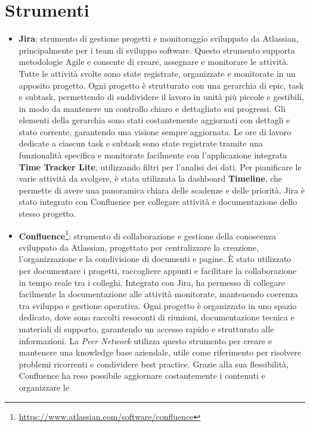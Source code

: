 \section{Strumenti}
\begin{itemize}
    \item \textbf{Jira}: strumento di gestione progetti e monitoraggio sviluppato da Atlassian, principalmente per i team di sviluppo software. Questo strumento
    supporta metodologie Agile e consente di creare, assegnare e monitorare le attività. Tutte le attività svolte sono state registrate, organizzate e monitorate
    in un apposito progetto. Ogni progetto è strutturato con una gerarchia di epic, task e subtask, permettendo di suddividere il lavoro in unità più piccole e
    gestibili, in modo da mantenere un controllo chiaro e dettagliato sui progressi. Gli elementi della gerarchia sono stati costantemente aggiornati con dettagli
    e stato corrente, garantendo una visione sempre aggiornata. Le ore di lavoro dedicate a ciascun task e subtask sono state registrate tramite una funzionalità
    specifica e monitorate facilmente con l’applicazione integrata \textbf{Time Tracker Lite}, utilizzando filtri per l’analisi dei dati. Per pianificare le varie attività
    da svolgere, è stata utilizzata la dashboard \textbf{Timeline}, che permette di avere una panoramica chiara delle scadenze e delle priorità. Jira è stato integrato con
    Confluence per collegare attività e documentazione dello stesso progetto.
    \item \textbf{Confluence}\footnote{\url{https://www.atlassian.com/software/confluence}}: strumento di collaborazione e gestione della conoscenza sviluppato da Atlassian, progettato per centralizzare la creazione, l'organizzazione
    e la condivisione di documenti e pagine. È stato utilizzato per documentare i progetti, raccogliere appunti e facilitare la collaborazione in tempo reale tra i colleghi.
    Integrato con Jira, ha permesso di collegare facilmente la documentazione alle attività monitorate, mantenendo coerenza tra sviluppo e gestione operativa. Ogni progetto
    è organizzato in uno spazio dedicato, dove sono raccolti resoconti di riunioni, documentazione tecnica e materiali di supporto, garantendo un accesso rapido e
    strutturato alle informazioni. La \textit{Peer Network} utilizza questo strumento per creare e mantenere una knowledge base aziendale, utile come riferimento per risolvere
    problemi ricorrenti e condividere best practice. Grazie alla sua flessibilità, Confluence ha reso possibile aggiornare costantemente i contenuti e organizzare le

\end{itemize}
